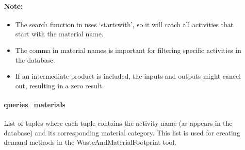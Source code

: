 \documentclass[letterpaper,10pt,english]{sphinxmanual}
\begin{document}
\paragraph{Note:}
\label{\detokenize{configuration_api:note}}\begin{itemize}
\item {} 
\sphinxAtStartPar
The search function in  uses ‘startswith’, so it will catch all activities that start with the material name.

\item {} 
\sphinxAtStartPar
The comma in material names is important for filtering specific activities in the database.

\item {} 
\sphinxAtStartPar
If an intermediate product is included, the inputs and outputs might cancel out, resulting in a zero result.

\end{itemize}


\paragraph{queries\_materials}
\label{\detokenize{configuration_api:queries-materials}}
\sphinxAtStartPar
List of tuples where each tuple contains the activity name (as appears in the database) and its corresponding material category. This list is used for creating demand methods in the WasteAndMaterialFootprint tool.
\end{document}
